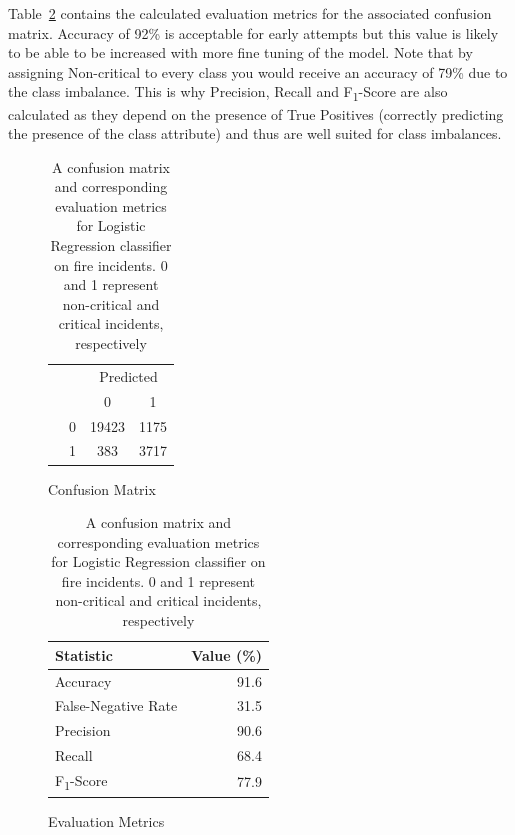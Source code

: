 \documentclass[12pt,letterpaper, oneside]
{article}
\begin{document}
Table~\ref{tab:lr-stats} contains the calculated evaluation metrics for the associated confusion matrix. Accuracy of 92\% is acceptable for early attempts but this value is likely to be able to be increased with more fine tuning of the model. Note that by assigning Non-critical to every class you would receive an accuracy of 79\% due to the class imbalance. This is why Precision, Recall and F\textsubscript{1}-Score are also calculated as they depend on the presence of True Positives (correctly predicting the presence of the class attribute) and thus are well suited for class imbalances.

\begin{table}
	\begin{subfigure}[h]{\textwidth}
		\centering
		\begin{tabular}{@{}cc cc@{}}
		\multicolumn{1}{c}{} &\multicolumn{1}{c}{} &\multicolumn{2}{c}{Predicted} \\ 
		\cmidrule(lr){3-4}
		\multicolumn{1}{c}{} & 
		\multicolumn{1}{c}{} & 
		\multicolumn{1}{c}{0} & 
		\multicolumn{1}{c}{1} \\ 
		\cline{2-4}
		\multirow[c]{2}{*}{\rotatebox[origin=tr]{90}{Actual}}
		& 0  & 19423 & 1175   \\[1.5ex]
		& 1  & 383   & 3717 \\ 
		\cline{2-4}
		\end{tabular}
		\caption{
			Confusion Matrix
			\label{tab:lr-cm}
		}
	\end{subfigure}
	\begin{subfigure}[h]{\textwidth}
		\begin{tabular}{l r}\toprule
			Statistic & Value (\%) \\ \midrule
			Accuracy & 91.6 \\
			False-Negative Rate & 31.5 \\
			Precision & 90.6 \\
			Recall & 68.4 \\
			F\textsubscript{1}-Score & 77.9 \\ \bottomrule
		\end{tabular}
		\caption{Evaluation Metrics
			\label{tab:lr-stats}
		}
	\end{subfigure}
	\caption{A confusion matrix and corresponding evaluation metrics for Logistic Regression classifier on fire incidents.	0 and 1 represent non-critical and critical incidents, respectively}

\end{table}
\end{document}
